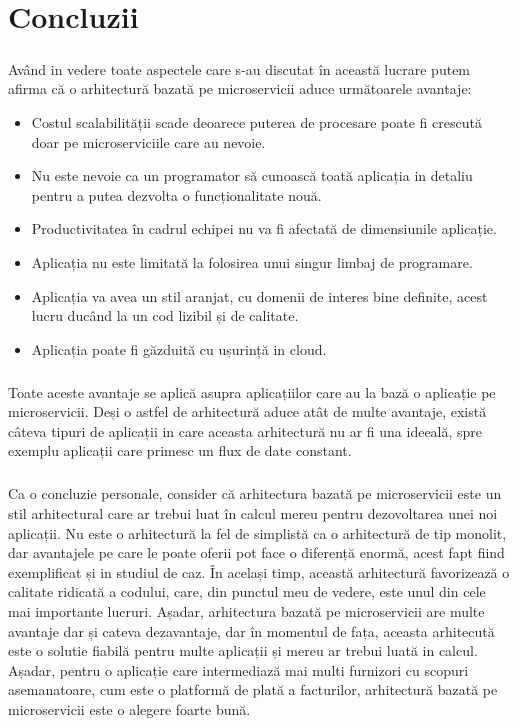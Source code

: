 \documentclass[12pt]{report}
\begin{document}
\chapter{Concluzii}
\paragraph{}Având in vedere toate aspectele care s-au discutat în această lucrare putem afirma că o arhitectură bazată pe microservicii aduce următoarele avantaje:
\begin{itemize}
\item Costul scalabilității scade deoarece puterea de procesare poate fi crescută doar pe microserviciile care au nevoie.
\item Nu este nevoie ca un programator să cunoască toată aplicația in detaliu pentru a putea dezvolta o funcționalitate nouă.
\item Productivitatea în cadrul echipei nu va fi afectată de dimensiunile aplicație.
\item Aplicația nu este limitată la folosirea unui singur limbaj de programare.
\item Aplicația va avea un stil aranjat, cu domenii de interes bine definite, acest lucru ducând la un cod lizibil și de calitate.
\item Aplicația poate fi găzduită cu ușurință in cloud.
\end{itemize}
\paragraph{}Toate aceste avantaje se aplică asupra aplicațiilor care au la bază o aplicație pe microservicii. Deși o astfel de arhitectură aduce atât de multe avantaje, există câteva tipuri de aplicații in care aceasta arhitectură nu ar fi una ideeală, spre exemplu aplicații care primesc un flux de date constant.
\paragraph{}Ca o concluzie personale, consider că arhitectura bazată pe microservicii este un stil arhitectural care ar trebui luat în calcul mereu pentru dezovoltarea unei noi aplicații. Nu este o arhitectură la fel de simplistă ca o arhitectură de tip monolit, dar avantajele pe care le poate oferii pot face o diferență enormă, acest fapt fiind exemplificat și in studiul de caz. În același timp, această arhitectură favorizează o calitate ridicată a codului, care, din punctul meu de vedere, este unul din cele mai importante lucruri. Așadar, arhitectura bazată pe microservicii are multe avantaje dar și cateva dezavantaje, dar în momentul de fața, aceasta arhitecută este o solutie fiabilă pentru multe aplicații și mereu ar trebui luată in calcul. Așadar, pentru o aplicație care intermediază mai multi furnizori cu scopuri asemanatoare, cum este o platformă de plată a facturilor, arhitectură bazată pe microservicii este o alegere foarte bună.


\end{document}
